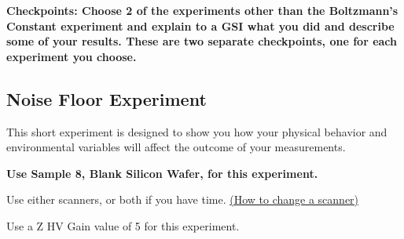 \documentclass{../lab}
\begin{document}
\textbf{Checkpoints: Choose 2 of the experiments other than the Boltzmann's Constant experiment and explain to a GSI what you did and describe some of your results. These are two separate checkpoints, one for each experiment you choose.}

\subsection{Noise Floor Experiment}
\label{subsec:NoiseFloor}

This short experiment is designed to show you how your physical behavior and environmental variables will affect the outcome of your measurements.

\textbf{Use Sample 8, Blank Silicon Wafer, for this experiment.}

Use either scanners, or both if you have time. \hyperref[subsec:ChangingScanners]{(How to change a scanner)}

Use a Z HV Gain value of 5 for this experiment.
\end{document}
